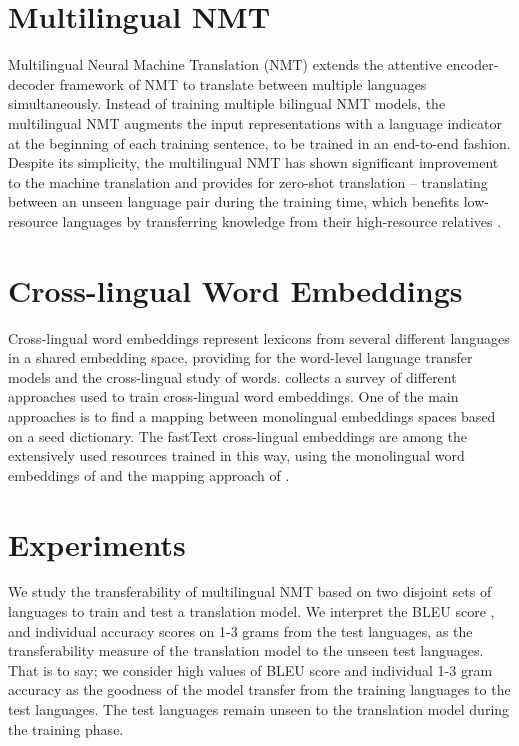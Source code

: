 \documentclass[11pt,a4paper]{article}
\begin{document}
\section{Multilingual NMT}
Multilingual Neural Machine Translation (NMT) \cite{Johnson:2016aa} extends the attentive encoder-decoder framework of NMT \citep{Bahdanau:2014aa} to translate between multiple languages simultaneously. 
Instead of training multiple bilingual NMT models, the multilingual NMT augments the input representations with a language indicator at the beginning of each training sentence, to be trained in an end-to-end fashion. 
Despite its simplicity, the multilingual NMT has shown significant improvement to the machine translation \citep{aharoni-etal-2019-massively} and provides for zero-shot translation -- translating between an unseen language pair during the training time, which benefits low-resource languages by transferring knowledge from their high-resource relatives \citep{Zoph:2016aa,Nguyen:2017aa}.


\section{Cross-lingual Word Embeddings}
Cross-lingual word embeddings represent lexicons from several different languages in a shared embedding space, providing for the word-level language transfer models and the cross-lingual study of words. 
\citet{Ruder:2019aa} collects a survey of different approaches used to train cross-lingual word embeddings.
One of the main approaches is to find a mapping between monolingual embeddings spaces based on a seed dictionary. The fastText cross-lingual embeddings are among the extensively used resources trained in this way, using the monolingual word embeddings of \citet{Bojanowski:2016aa} and the mapping approach of \citet{Joulin:2018aa}. 

\section{Experiments}
We study the transferability of multilingual NMT based on two disjoint sets of languages to train and test a translation model.
We interpret the BLEU score \cite{papineni-etal-2002-bleu}, and individual accuracy scores on 1-3 grams from the test languages, as the transferability measure of the translation model to the unseen test languages. That is to say; we consider high values of BLEU score and individual 1-3 gram accuracy as the goodness of the model transfer from the training languages to the test languages. The test languages remain unseen to the translation model during the training phase. 
\end{document}
